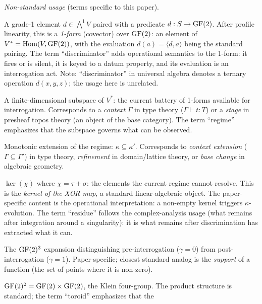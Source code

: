 \emph{Non-standard usage} (terms specific to this paper).
\begin{description}[nosep,leftmargin=1.5cm]
  \item[Discriminator] A grade-1 element $d \in
    \bigwedge^1 V$ paired with a predicate $d: S \to
    \operatorname{GF}(2)$. After profile linearity, this is a
    \emph{1-form} (covector) over $\GF(2)$: an element
    of $V^* = \operatorname{Hom}(V, \operatorname{GF}(2))$, with the
    evaluation $d(a) = \langle d, a \rangle$ being the
    standard pairing. The term ``discriminator'' adds
    operational semantics to the 1-form: it fires or is
    silent, it is keyed to a datum property, and its
    evaluation is an interrogation act. Note: ``discriminator''
    in universal algebra denotes a ternary operation
    $d(x,y,z)$; the usage here is unrelated.
  \item[$\kappa$-regime] A finite-dimensional subspace of
    $V^*$: the current battery of 1-forms available for
    interrogation. Corresponds to a \emph{context} $\Gamma$
    in type theory ($\Gamma \vdash t : T$) or a
    \emph{stage} in presheaf topos theory (an object of
    the base category). The term ``regime'' emphasizes that
    the subspace governs what can be observed.
  \item[$\kappa$-evolution] Monotonic extension of the
    regime: $\kappa \subseteq \kappa'$. Corresponds to
    \emph{context extension} ($\Gamma \subseteq \Gamma'$)
    in type theory, \emph{refinement} in domain/lattice
    theory, or \emph{base change} in algebraic geometry.
  \item[Residue] $\ker(\chi)$ where $\chi = \tau + \sigma$:
    the elements the current regime cannot resolve. This
    is the \emph{kernel of the XOR map}, a standard
    linear-algebraic object. The paper-specific content
    is the operational interpretation: a non-empty kernel
    triggers $\kappa$-evolution. The term ``residue''
    follows the complex-analysis usage (what remains after
    integration around a singularity): it is what remains
    after discrimination has extracted what it can.
  \item[Coverage profile / $\gamma$-bit] The $\operatorname{GF}(2)^3$
    expansion distinguishing pre-interrogation ($\gamma = 0$)
    from post-interrogation ($\gamma = 1$). Paper-specific;
    closest standard analog is the \emph{support} of a
    function (the set of points where it is non-zero).
  \item[$\GF(2)$ toroid] $\operatorname{GF}(2)^2 = \operatorname{GF}(2) \times \operatorname{GF}(2)$,
    the Klein four-group. The product structure is
    standard; the term ``toroid'' emphasizes that the

\end{description}
